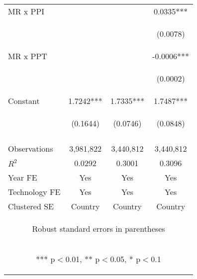 \begin{center}
\begin{tabular}{lccc}
MR x PPI &  &  & 0.0335*** \\
\vspace{4pt} & \begin{footnotesize}\end{footnotesize} & \begin{footnotesize}\end{footnotesize} & \begin{footnotesize}(0.0078)\end{footnotesize} \\
MR x PPT &  &  & -0.0006*** \\
\vspace{4pt} & \begin{footnotesize}\end{footnotesize} & \begin{footnotesize}\end{footnotesize} & \begin{footnotesize}(0.0002)\end{footnotesize} \\
Constant & 1.7242*** & 1.7335*** & 1.7487*** \\
 & \begin{footnotesize}(0.1644)\end{footnotesize} & \begin{footnotesize}(0.0746)\end{footnotesize} & \begin{footnotesize}(0.0848)\end{footnotesize} \\
\vspace{4pt} & \begin{footnotesize}\end{footnotesize} & \begin{footnotesize}\end{footnotesize} & \begin{footnotesize}\end{footnotesize} \\
Observations & 3,981,822 & 3,440,812 & 3,440,812 \\
$R^2$ & 0.0292 & 0.3001 & 0.3096 \\
Year FE & Yes & Yes & Yes \\
Technology FE & Yes & Yes & Yes \\
 Clustered SE & Country & Country & Country \\ \hline
\multicolumn{4}{c}{\begin{footnotesize} Robust standard errors in parentheses\end{footnotesize}} \\
\multicolumn{4}{c}{\begin{footnotesize} *** p$<$0.01, ** p$<$0.05, * p$<$0.1\end{footnotesize}} \\
\end{tabular}
\end{center}
